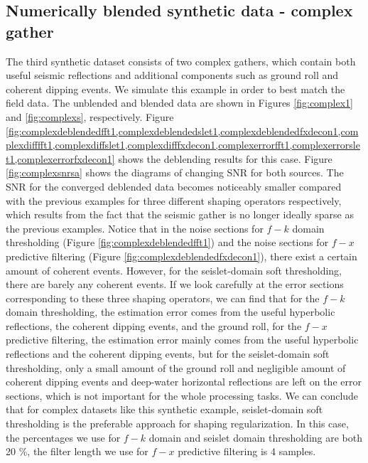 \subsection{Numerically blended synthetic data - complex gather}
The third synthetic dataset consists of two complex gathers, which contain both useful seismic reflections and additional components such as ground roll and coherent dipping events. We simulate this example in order to best match the field data. The unblended and blended data are shown in Figures \ref{fig:complex1} and \ref{fig:complexs}, respectively. Figure \ref{fig:complexdeblendedfft1,complexdeblendedslet1,complexdeblendedfxdecon1,complexdifffft1,complexdiffslet1,complexdifffxdecon1,complexerrorfft1,complexerrorslet1,complexerrorfxdecon1}
shows the deblending results for this case. Figure \ref{fig:complexsnrsa} shows the diagrams of changing SNR for both sources. The SNR for the converged deblended data becomes noticeably smaller compared with the previous examples for three different shaping operators respectively, which results from the fact that the seismic gather is no longer ideally sparse as the previous examples. Notice that in the noise sections for $f-k$ domain thresholding (Figure \ref{fig:complexdeblendedfft1}) and the noise sections for $f-x$ predictive filtering (Figure \ref{fig:complexdeblendedfxdecon1}), there exist a certain amount of coherent events. However, for the seislet-domain soft thresholding, there are barely any coherent events. If we look carefully at the error sections corresponding to these three shaping operators, we can find that for the $f-k$ domain thresholding, the estimation error comes from the useful hyperbolic reflections, the coherent dipping events, and the ground roll, for the $f-x$ predictive filtering, the estimation error mainly comes from the useful hyperbolic reflections and the coherent dipping events, but for the seislet-domain soft thresholding, only a small amount of the ground roll and negligible amount of coherent dipping events and deep-water horizontal reflections are left on the error sections, which is not important for the whole processing tasks. We can conclude that for complex datasets like this synthetic example, seislet-domain soft thresholding is the preferable approach for shaping regularization.
In this case, the percentages we use for $f-k$ domain and seislet domain thresholding are both 20 \%, the filter length we use for $f-x$ predictive filtering is 4 samples. 


